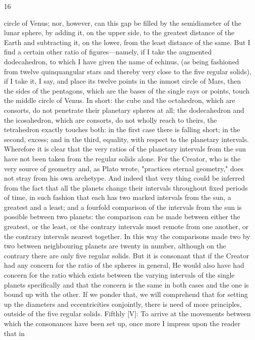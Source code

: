\documentclass{article}
\begin{document}
16

circle of Venus; nor, however, can this gap be filled by the semidiameter
of the lunar sphere, by adding it, on the upper side, to the greatest
distance of the Earth and subtracting it, on the lower, from the least
distance of the same. But I find a certain other ratio of figures—namely,
if I take the augmented dodecahedron, to which I have given the name of
echinus, (as being fashioned from twelve quinquangular stars and
thereby very close to the five regular solids), if I take it, I say, and place
its twelve points in the inmost circle of Mars, then the sides of the
pentagons, which are the bases of the single rays or points, touch the
middle circle of Venus. In short: the cube and the octahedron, which are
consorts, do not penetrate their planetary spheres at all; the
dodecahedron and the icosahedron, which are consorts, do not wholly
reach to theirs, the tetrahedron exactly touches both: in the first case
there is falling short; in the second, excess; and in the third, equality,
with respect to the planetary intervals.
Wherefore it is clear that the very ratios of the planetary intervals from
the sun have not been taken from the regular solids alone. For the
Creator, who is the very source of geometry and, as Plato wrote,
"practices eternal geometry," does not stray from his own archetype. And
indeed that very thing could be inferred from the fact that all the planets
change their intervals throughout fixed periods of time, in such fashion
that each has two marked intervals from the sun, a greatest and a least;
and a fourfold comparison of the intervals from the sun is possible
between two planets: the comparison can be made between either the
greatest, or the least, or the contrary intervals most remote from one
another, or the contrary intervals nearest together. In this way the
comparisons made two by two between neighbouring planets are twenty
in number, although on the contrary there are only five regular solids.
But it is consonant that if the Creator had any concern for the ratio of the
spheres in general, He would also have had concern for the ratio which
exists between the varying intervals of the single planets specifically and
that the concern is the same in both cases and the one is bound up with
the other. If we ponder that, we will comprehend that for setting up the
diameters and eccentricities conjointly, there is need of more principles,
outside of the five regular solids.
Fifthly [V]: To arrive at the movements between which the consonances
have been set up, once more I impress upon the reader that in
\end{document}
